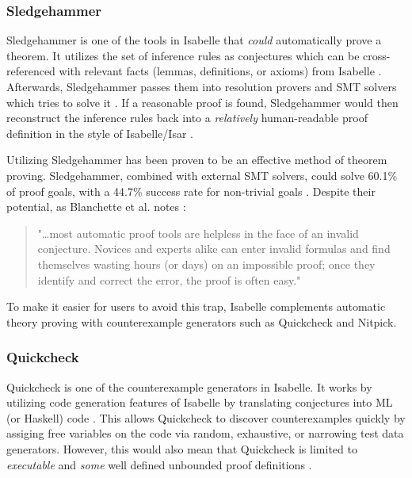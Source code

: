 \subsubsection{Sledgehammer}
\label{sec:Sledgehammer}

Sledgehammer is one of the tools in Isabelle that \emph{could} automatically prove a theorem. It utilizes the set of inference rules as 
conjectures which can be cross-referenced with relevant facts (lemmas, definitions, or axioms) from Isabelle \cite[Sec. 3]{isabelleProof}. 
Afterwards, Sledgehammer passes them into resolution provers and SMT solvers which tries to solve it \cite[Sec. 3.3]{isabelleProof}. If a reasonable 
proof is found, Sledgehammer would then reconstruct the inference rules back into a \emph{relatively} human-readable proof definition in the style of 
Isabelle/Isar \cite[Sec. 3.4]{isabelleProof}.

Utilizing Sledgehammer has been proven to be an effective method of theorem proving. Sledgehammer, combined with external SMT solvers, could 
solve 60.1\% of proof goals, with a 44.7\% success rate for non-trivial goals \cite[Sec. 6]{isabelleSledgehammerSMT}. Despite their 
potential, as Blanchette et al. notes \cite[pp. 2]{isabelleProof}:

\begin{quote}
    "\dots most automatic proof tools are helpless in the face of an invalid conjecture. Novices and experts alike can enter invalid formulas and 
    find themselves wasting hours (or days) on an impossible proof; once they identify and correct the error, the proof is often easy."
\end{quote}

To make it easier for users to avoid this trap, Isabelle complements automatic theory proving with counterexample generators such as Quickcheck 
and Nitpick.

\subsubsection{Quickcheck}
\label{sec:Quickcheck}

Quickcheck is one of the counterexample generators in Isabelle. It works by utilizing code generation features of Isabelle by translating 
conjectures into ML (or Haskell) code \cite{isabelleQuickcheck}. This allows Quickcheck to discover counterexamples quickly by assiging 
free variables on the code via random, exhaustive, or narrowing test data generators. However, this would also mean that Quickcheck is limited 
to \emph{executable} and \emph{some} well defined unbounded proof definitions \cite{isabelleQuickcheck}.

